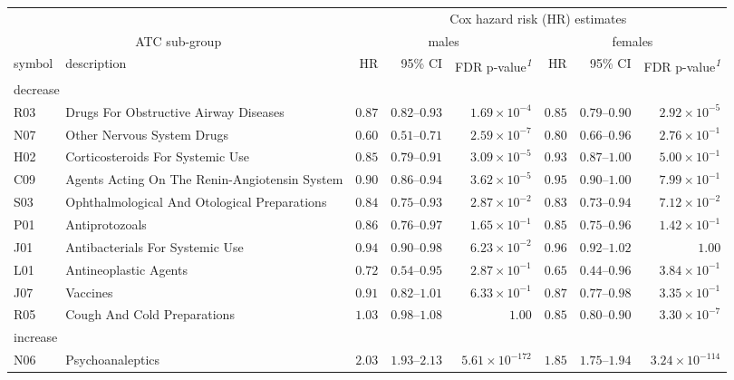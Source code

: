 \setlength{\LTpost}{0mm}
\begin{longtable}{llrrrrrr}
\toprule
 &  & \multicolumn{6}{c}{Cox hazard risk (HR) estimates} \\ 
\cmidrule(lr){3-8}
\multicolumn{2}{c}{ATC sub-group} & \multicolumn{3}{c}{males} & \multicolumn{3}{c}{females} \\ 
\cmidrule(lr){1-2} \cmidrule(lr){3-5} \cmidrule(lr){6-8}
symbol & description & HR & 95\% CI & FDR p-value\textsuperscript{\textit{1}} & HR & 95\% CI & FDR p-value\textsuperscript{\textit{1}} \\ 
\midrule
\multicolumn{8}{l}{decrease} \\ 
\midrule
R03 & Drugs For Obstructive Airway Diseases & $0.87$ & $0.82$–$0.93$ & $1.69 \times 10^{-4}$ & $0.85$ & $0.79$–$0.90$ & $2.92 \times 10^{-5}$ \\ 
N07 & Other Nervous System Drugs & $0.60$ & $0.51$–$0.71$ & $2.59 \times 10^{-7}$ & $0.80$ & $0.66$–$0.96$ & $2.76 \times 10^{-1}$ \\ 
H02 & Corticosteroids For Systemic Use & $0.85$ & $0.79$–$0.91$ & $3.09 \times 10^{-5}$ & $0.93$ & $0.87$–$1.00$ & $5.00 \times 10^{-1}$ \\ 
C09 & Agents Acting On The Renin-Angiotensin System & $0.90$ & $0.86$–$0.94$ & $3.62 \times 10^{-5}$ & $0.95$ & $0.90$–$1.00$ & $7.99 \times 10^{-1}$ \\ 
S03 & Ophthalmological And Otological Preparations & $0.84$ & $0.75$–$0.93$ & $2.87 \times 10^{-2}$ & $0.83$ & $0.73$–$0.94$ & $7.12 \times 10^{-2}$ \\ 
P01 & Antiprotozoals & $0.86$ & $0.76$–$0.97$ & $1.65 \times 10^{-1}$ & $0.85$ & $0.75$–$0.96$ & $1.42 \times 10^{-1}$ \\ 
J01 & Antibacterials For Systemic Use & $0.94$ & $0.90$–$0.98$ & $6.23 \times 10^{-2}$ & $0.96$ & $0.92$–$1.02$ & $1.00$ \\ 
L01 & Antineoplastic Agents & $0.72$ & $0.54$–$0.95$ & $2.87 \times 10^{-1}$ & $0.65$ & $0.44$–$0.96$ & $3.84 \times 10^{-1}$ \\ 
J07 & Vaccines & $0.91$ & $0.82$–$1.01$ & $6.33 \times 10^{-1}$ & $0.87$ & $0.77$–$0.98$ & $3.35 \times 10^{-1}$ \\ 
R05 & Cough And Cold Preparations & $1.03$ & $0.98$–$1.08$ & $1.00$ & $0.85$ & $0.80$–$0.90$ & $3.30 \times 10^{-7}$ \\ 
\midrule
\multicolumn{8}{l}{increase} \\ 
\midrule
N06 & Psychoanaleptics & $2.03$ & $1.93$–$2.13$ & $5.61 \times 10^{-172}$ & $1.85$ & $1.75$–$1.94$ & $3.24 \times 10^{-114}$ \\ 

\end{longtable}

